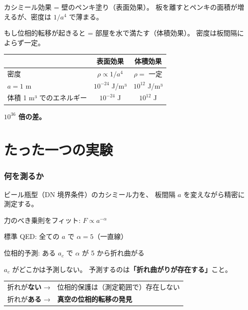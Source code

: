 \documentclass[12pt,a4paper]{article}
\begin{document}
\begin{storybox}[壁のペンキから部屋の水へ]
カシミール効果 = 壁のペンキ塗り（表面効果）。
板を離すとペンキの面積が増えるが、密度は $1/a^4$ で薄まる。

もし位相的転移が起きると = 部屋を水で満たす（体積効果）。
密度は板間隔によらず一定。

\begin{center}
\begin{tabular}{lcc}
\toprule
& 表面効果 & 体積効果 \\
\midrule
密度 & $\rho \propto 1/a^4$ & $\rho =$ 一定 \\
$a = 1$ m & $10^{-24}$ J/m³ & $10^{12}$ J/m³ \\
体積 1 m³ でのエネルギー & $10^{-24}$ J & $10^{12}$ J \\
\bottomrule
\end{tabular}
\end{center}

\textbf{$10^{36}$ 倍の差。}
\end{storybox}

\part{たった一つの実験}

\section{何を測るか}

\begin{resultbox}[最もシンプルな実験]
ビール瓶型（DN 境界条件）のカシミール力を、
板間隔 $a$ を変えながら精密に測定する。

力のべき乗則をフィット: $F \propto a^{-\alpha}$

標準 QED: 全ての $a$ で $\alpha = 5$（一直線）

位相的予測: ある $a_c$ で $\alpha$ が 5 から折れ曲がる

$a_c$ がどこかは予測しない。
予測するのは\textbf{「折れ曲がりが存在する」}こと。

\begin{center}
\begin{tabular}{ll}
折れが\textbf{ない} → & 位相的保護は（測定範囲で）存在しない \\
折れが\textbf{ある} → & \textbf{真空の位相的転移の発見} \\
\end{tabular}
\end{center}
\end{resultbox}
\end{document}
